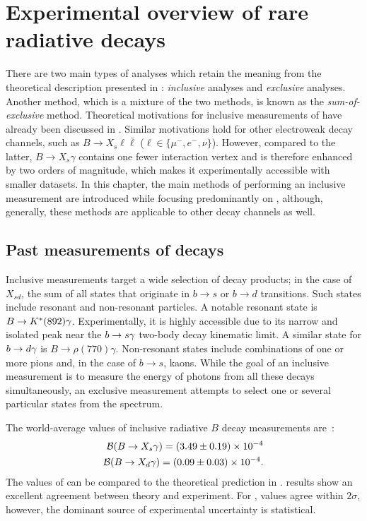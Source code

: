 \chapter{Experimental overview of rare radiative decays}\label{ch:exp_overview}

There are two main types of analyses which retain the meaning 
from the theoretical description presented in : \textit{inclusive} analyses and \textit{exclusive} analyses.
Another method, which is a mixture of the two methods, is known as the \textit{sum-of-exclusive} method.
Theoretical motivations for inclusive measurements of \BtoXsgamma have already been discussed in .
Similar motivations hold for other electroweak decay channels, such as $B\to X_s\ell\bar{\ell}$ ($\ell\in\{\mu^-,e^-,\nu\}$).
However, compared to the latter, $B\rightarrow X_s\gamma$ contains one fewer interaction vertex and is therefore enhanced by two orders of magnitude, which makes it experimentally accessible with smaller datasets.
In this chapter, the main methods of performing an inclusive measurement are introduced while focusing predominantly on \BtoXsdgamma, although, generally, these methods are applicable to other decay channels as well.

\section{Past measurements of \safeBtoXsdgamma decays}

Inclusive measurements target a wide selection of decay products; in the case of $X_{sd}$, the sum of all states that originate in $b\to s$ or $b\to d$ transitions.
Such states include resonant and non-resonant particles.
A notable resonant state is $B\rightarrow K^*(892)\gamma$.
Experimentally, it is highly accessible due to its narrow and isolated peak near the $b\rightarrow s\gamma$ two-body decay kinematic limit.
A similar state for $b\rightarrow d\gamma$ is $B\rightarrow \rho(770)\gamma$.
Non-resonant states include combinations of one or more pions and, in the case of $b\rightarrow s$, kaons.
While the goal of an inclusive measurement is to measure the energy of photons from all these decays simultaneously, an exclusive measurement attempts to select one or several particular states from the spectrum.

The world-average values of inclusive radiative $B$ decay measurements are~\cite{Amhis:2022mac,Workman:2022ynf}:
\begin{align}\label{eq:btosgamma_experimental}
    \begin{split}
    \mathcal{B}(\BtoXsgamma)=(3.49\pm 0.19)\times10^{-4}\\
    \mathcal{B}(\BtoXdgamma)=(0.09\pm 0.03)\times10^{-4}.
    \end{split}
\end{align}
The values of  can be compared to the theoretical prediction in .
\BtoXsgamma results show an excellent agreement between theory and experiment.
For \BtoXdgamma, values agree within $2\sigma$, however, the dominant source of experimental uncertainty is statistical. 

